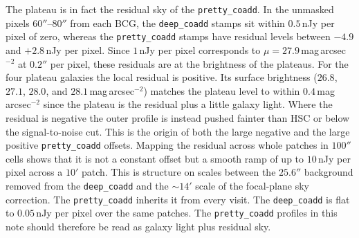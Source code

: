 \documentclass[SE,lsstdraft,authoryear,toc]{lsstdoc}
\begin{document}
The plateau is in fact the residual sky of the \texttt{pretty\_coadd}. In the unmasked pixels $60''$--$80''$ from each BCG, the \texttt{deep\_coadd} stamps sit within $0.5$\,nJy per pixel of zero, whereas the \texttt{pretty\_coadd} stamps have residual levels between $-4.9$ and $+2.8$\,nJy per pixel. Since $1$\,nJy per pixel corresponds to $\mu = 27.9$\,mag\,arcsec$^{-2}$ at $0.2''$ per pixel, these residuals are at the brightness of the plateaus. For the four plateau galaxies the local residual is positive. Its surface brightness ($26.8$, $27.1$, $28.0$, and $28.1$\,mag\,arcsec$^{-2}$) matches the plateau level to within $0.4$\,mag\,arcsec$^{-2}$ since the plateau is the residual plus a little galaxy light. Where the residual is negative the outer profile is instead pushed fainter than HSC or below the signal-to-noise cut. This is the origin of both the large negative and the large positive \texttt{pretty\_coadd} offsets. Mapping the residual across whole patches in $100''$ cells shows that it is not a constant offset but a smooth ramp of up to $10$\,nJy per pixel across a $10'$ patch. This is structure on scales between the $25.6''$ background removed from the \texttt{deep\_coadd} and the $\sim 14'$ scale of the focal-plane sky correction. The \texttt{pretty\_coadd} inherits it from every visit. The \texttt{deep\_coadd} is flat to $0.05$\,nJy per pixel over the same patches. The \texttt{pretty\_coadd} profiles in this note should therefore be read as galaxy light plus residual sky.
\end{document}
